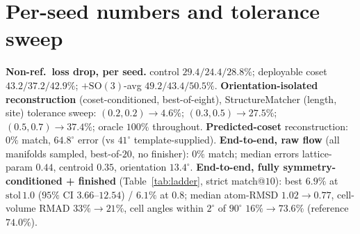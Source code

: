 \documentclass[10pt]{article}
\begin{document}
\section{Per-seed numbers and tolerance sweep}
\label{app:numbers}
\textbf{Non-ref.\ loss drop, per seed.} control $29.4/24.4/28.8\%$; deployable
coset $43.2/37.2/42.9\%$; $+\mathrm{SO}(3)$-avg $49.2/43.4/50.5\%$.
\textbf{Orientation-isolated reconstruction} (coset-conditioned, best-of-eight),
StructureMatcher (length, site) tolerance sweep: $(0.2,0.2)\!\to\!4.6\%$;
$(0.3,0.5)\!\to\!27.5\%$; $(0.5,0.7)\!\to\!37.4\%$; oracle $100\%$ throughout.
\textbf{Predicted-coset} reconstruction: $0\%$ match, $64.8^\circ$ error (vs
$41^\circ$ template-supplied). \textbf{End-to-end, raw flow} (all manifolds sampled,
best-of-$20$, no finisher): $0\%$ match; median errors lattice-param $0.44$,
centroid $0.35$, orientation $13.4^\circ$. \textbf{End-to-end, fully
symmetry-conditioned + finished} (Table~\ref{tab:ladder}, strict match@$10$): best
$6.9\%$ at $\text{stol}\,1.0$ ($95\%$ CI $3.66$--$12.54$) / $6.1\%$ at $0.8$;
median atom-RMSD $1.02\!\to\!0.77$, cell-volume RMAD $33\%\!\to\!21\%$, cell angles
within $2^\circ$ of $90^\circ$ $16\%\!\to\!73.6\%$ (reference $74.0\%$).
\end{document}
